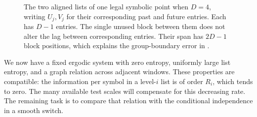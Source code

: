 \begin{figure}[tb]
\centering
{}
\caption{The two aligned lists of one legal symbolic point when $D=4$,
writing $U_j,V_j$ for
their corresponding past and future entries. Each has $D-1$ entries.
The single unused block between them does not alter the lag between
corresponding entries. Their span has $2D-1$ block positions, which
explains the group-boundary error in .}
\label{fig:lists}
\end{figure}

We now have a fixed ergodic system with zero entropy, uniformly
large list entropy, and a graph relation across adjacent windows.
These properties are compatible: the information per symbol in a
level-$i$ list is of order $R_i$, which tends to zero. The many
available test scales will compensate for this decreasing rate.
The remaining task is to compare that relation with the
conditional independence in a smooth switch.
